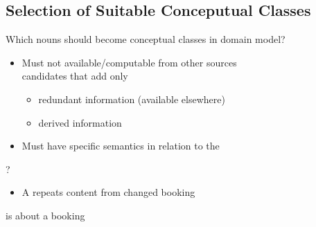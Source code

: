 \subsection{Selection of Suitable Conceputual Classes}
\begin{defBox}
    Which nouns should become conceptual classes in domain model?
\end{defBox}
  
\begin{defBox}[title=Criteria to include a candidate conceptual class:]
    \begin{itemize}
        \item Must  not available/computable from other sources\\
         candidates that add only
        \begin{itemize}
            \item redundant information (available elsewhere)
            \item derived information
        \end{itemize}
        \item Must have specific semantics in relation to the 
    \end{itemize}
\end{defBox}
  ?
\begin{itemize}
    \item A  repeats content from changed booking
\end{itemize}
  is  about a booking


